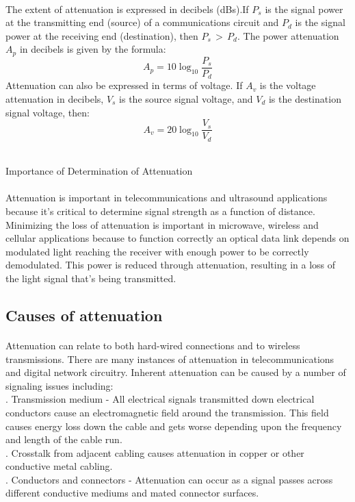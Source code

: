 \documentclass[12pt,a4paper]{article}%
\begin{document}
\begin{flushleft}
		\paragraph{}
		The extent of attenuation is expressed in decibels (dBs).If $P_s$ is the signal power at the transmitting end (source) of a communications circuit and $P_d$ is the signal power at the receiving end (destination), then $P_s\, >\, P_d$. The power attenuation $A_p$ in decibels is given by the formula:
		$$A_p= 10\log_{10}{\frac{P_s}{P_d}}$$
		Attenuation can also be expressed in terms of voltage. If $A_v$ is the voltage attenuation in decibels, $V_s$ is the source signal voltage, and $V_d$ is the destination signal voltage, then:$$A_v= 20\log_{10}{\frac{V_s}{V_d}}$$\\\bigskip
		\item Importance of Determination of Attenuation
		\paragraph{}
		Attenuation is important in telecommunications and ultrasound applications because it’s critical to determine signal strength as a function of distance. Minimizing the loss of attenuation is important in microwave, wireless and cellular applications because to function correctly an optical data link depends on modulated light reaching the receiver with enough power to be correctly demodulated. This power is reduced through attenuation, resulting in a loss of the light signal that’s being transmitted.
		
		\subsection{ Causes of attenuation} 
		\paragraph{}
		Attenuation can relate to both hard-wired connections and to wireless transmissions. There are many instances of attenuation in telecommunications and digital network circuitry. Inherent attenuation can be caused by a number of signaling issues including:\\. Transmission medium - All electrical signals transmitted down electrical conductors cause an electromagnetic field around the transmission. This field causes energy loss down the cable and gets worse depending upon the frequency and length of the cable run. \\.  Crosstalk from adjacent cabling causes attenuation in copper or other conductive metal cabling.\\. Conductors and connectors - Attenuation can occur as a signal passes across different conductive mediums and mated connector surfaces.\\\bigskip
		

\end{flushleft}
\end{document}
